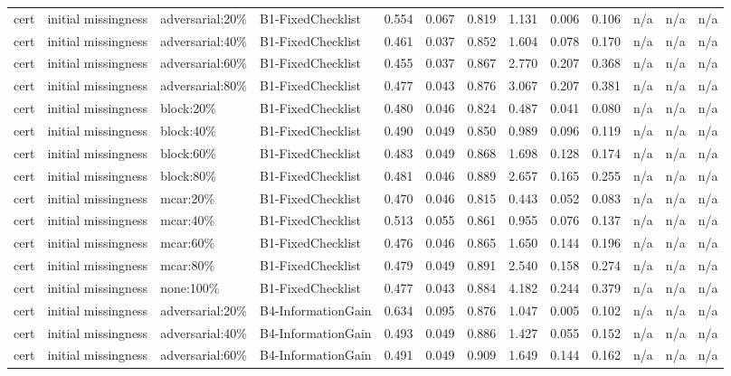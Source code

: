 \begin{table}[!ht]
{\begin{tabular}{lllllllllllll}
cert & initial missingness & adversarial:20\% & B1-FixedChecklist & 0.554 & 0.067 & 0.819 & 1.131 & 0.006 & 0.106 & n/a & n/a & n/a \\
cert & initial missingness & adversarial:40\% & B1-FixedChecklist & 0.461 & 0.037 & 0.852 & 1.604 & 0.078 & 0.170 & n/a & n/a & n/a \\
cert & initial missingness & adversarial:60\% & B1-FixedChecklist & 0.455 & 0.037 & 0.867 & 2.770 & 0.207 & 0.368 & n/a & n/a & n/a \\
cert & initial missingness & adversarial:80\% & B1-FixedChecklist & 0.477 & 0.043 & 0.876 & 3.067 & 0.207 & 0.381 & n/a & n/a & n/a \\
cert & initial missingness & block:20\% & B1-FixedChecklist & 0.480 & 0.046 & 0.824 & 0.487 & 0.041 & 0.080 & n/a & n/a & n/a \\
cert & initial missingness & block:40\% & B1-FixedChecklist & 0.490 & 0.049 & 0.850 & 0.989 & 0.096 & 0.119 & n/a & n/a & n/a \\
cert & initial missingness & block:60\% & B1-FixedChecklist & 0.483 & 0.049 & 0.868 & 1.698 & 0.128 & 0.174 & n/a & n/a & n/a \\
cert & initial missingness & block:80\% & B1-FixedChecklist & 0.481 & 0.046 & 0.889 & 2.657 & 0.165 & 0.255 & n/a & n/a & n/a \\
cert & initial missingness & mcar:20\% & B1-FixedChecklist & 0.470 & 0.046 & 0.815 & 0.443 & 0.052 & 0.083 & n/a & n/a & n/a \\
cert & initial missingness & mcar:40\% & B1-FixedChecklist & 0.513 & 0.055 & 0.861 & 0.955 & 0.076 & 0.137 & n/a & n/a & n/a \\
cert & initial missingness & mcar:60\% & B1-FixedChecklist & 0.476 & 0.046 & 0.865 & 1.650 & 0.144 & 0.196 & n/a & n/a & n/a \\
cert & initial missingness & mcar:80\% & B1-FixedChecklist & 0.479 & 0.049 & 0.891 & 2.540 & 0.158 & 0.274 & n/a & n/a & n/a \\
cert & initial missingness & none:100\% & B1-FixedChecklist & 0.477 & 0.043 & 0.884 & 4.182 & 0.244 & 0.379 & n/a & n/a & n/a \\
cert & initial missingness & adversarial:20\% & B4-InformationGain & 0.634 & 0.095 & 0.876 & 1.047 & 0.005 & 0.102 & n/a & n/a & n/a \\
cert & initial missingness & adversarial:40\% & B4-InformationGain & 0.493 & 0.049 & 0.886 & 1.427 & 0.055 & 0.152 & n/a & n/a & n/a \\
cert & initial missingness & adversarial:60\% & B4-InformationGain & 0.491 & 0.049 & 0.909 & 1.649 & 0.144 & 0.162 & n/a & n/a & n/a \\

\end{tabular}}
\end{table}
